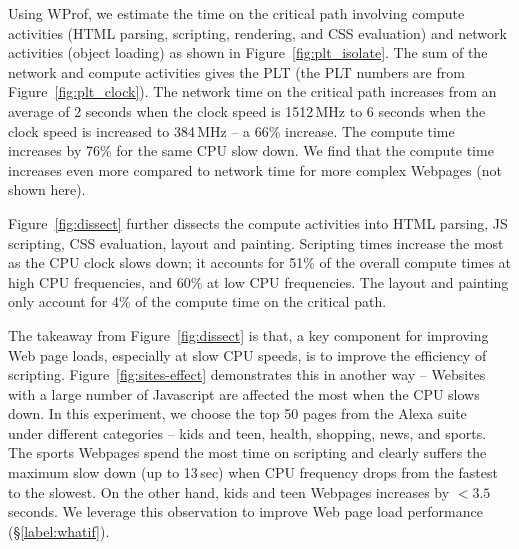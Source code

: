 Using WProf, we estimate the time on the critical path involving compute activities (HTML parsing, scripting, rendering, and CSS evaluation) and network activities (object loading) as shown in Figure~\ref{fig:plt_isolate}. The sum of the network and compute activities gives the PLT (the PLT numbers are from Figure~\ref{fig:plt_clock}). The network time on the critical path increases from an average of 2 seconds when the clock speed is 1512\,MHz to 6 seconds when the clock speed is increased to 384\,MHz -- a 66\% increase. The compute time increases by 76\% for the same CPU slow down. We find that the compute time increases even more compared to network time for more complex Webpages (not shown here). 

Figure~\ref{fig:dissect} further dissects the compute activities into HTML parsing, JS scripting, CSS evaluation, layout and painting. 
Scripting times increase the most as the CPU clock slows down; it accounts for 51\% of the overall compute times at high CPU frequencies, and 60\% at low CPU frequencies. The layout and painting only account for 4\% of the compute time on the critical path. 

The  takeaway from Figure~\ref{fig:dissect} is that, a key component for improving Web page loads, especially at slow CPU speeds, is to  improve the efficiency of scripting. 
%
Figure~\ref{fig:sites-effect} demonstrates
this in another way -- Websites with a large number of Javascript are affected the most when the CPU slows down. In this experiment, we choose the top 50 pages from the  Alexa suite~\cite{alexa} under different categories -- kids and teen, health, shopping, news, and sports. 
The sports Webpages spend the most time on scripting and clearly suffers the maximum slow down (up to 13\,sec) when CPU frequency drops from the fastest
to the slowest. On the other hand, kids and teen Webpages increases by $<3.5$ seconds. We leverage this observation to improve Web page load performance (\S\ref{label:whatif}).


